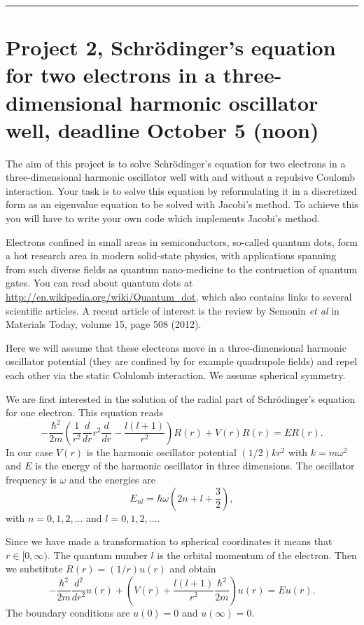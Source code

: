 \documentclass[11pt,a4wide]{article}
\begin{document}
 
\noindent\rule{\textwidth}{1pt}
\section*{Project 2, Schr\"odinger's equation for two electrons in a three-dimensional harmonic oscillator well, deadline  October 5 (noon)}

The aim of this project is to solve Schr\"odinger's equation for two
electrons in a three-dimensional harmonic oscillator well with and
without a repulsive Coulomb interaction.  Your task is to solve this
equation by reformulating it in a discretized form as an eigenvalue
equation to be solved with Jacobi's method. To achieve this you will
have to write your own code which implements Jacobi's method.

Electrons confined in small areas in semiconductors, so-called quantum
dots, form a hot research area in modern solid-state physics, with
applications spanning from such diverse fields as quantum
nano-medicine to the contruction of quantum gates. You can read about
quantum dots at \url{http://en.wikipedia.org/wiki/Quantum_dot}, which
also contains links to several scientific articles. A recent article
of interest is the review by Semonin {\em et al} in Materials Today,
volume 15, page 508 (2012).

Here we will assume that these electrons move in a three-dimensional harmonic
oscillator potential (they are confined by for example quadrupole fields)
and repel  each other via the static Colulomb interaction.  
We assume spherical symmetry.  

We are first interested in the solution of the radial part of Schr\"odinger's equation for one electron. This equation reads
\[
  -\frac{\hbar^2}{2 m} \left ( \frac{1}{r^2} \frac{d}{dr} r^2
  \frac{d}{dr} - \frac{l (l + 1)}{r^2} \right )R(r) 
     + V(r) R(r) = E R(r).
\]
In our case $V(r)$ is the harmonic oscillator potential $(1/2)kr^2$ with
$k=m\omega^2$ and $E$ is
the energy of the harmonic oscillator in three dimensions.
The oscillator frequency is $\omega$ and the energies are
\[
E_{nl}=  \hbar \omega \left(2n+l+\frac{3}{2}\right),
\]
with $n=0,1,2,\dots$ and $l=0,1,2,\dots$.
 
Since we have made a transformation to spherical coordinates it means that 
$r\in [0,\infty)$.  
The quantum number
$l$ is the orbital momentum of the electron.  
%
Then we substitute $R(r) = (1/r) u(r)$ and obtain
%
\[
  -\frac{\hbar^2}{2 m} \frac{d^2}{dr^2} u(r) 
       + \left ( V(r) + \frac{l (l + 1)}{r^2}\frac{\hbar^2}{2 m}
                                    \right ) u(r)  = E u(r) .
\]
%
The boundary conditions are $u(0)=0$ and $u(\infty)=0$.
\end{document}
